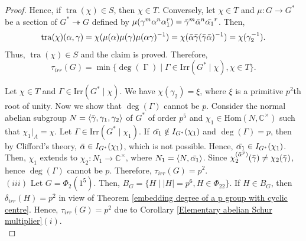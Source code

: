 \documentclass[a4paper,11pt]{amsart}
\numberwithin{equation}{section}
\numberwithin{equation}{subsection}
\newcommand{\C}{\mathbb{C}}
\newcommand{\Z}{\mathbb{Z}}
\newcommand{\Hom}{\mathrm{Hom}}
\newcommand{\Nayak}[1]{{\color{red} #1}}
\newcommand{\poonam}[1]{{\color{blue} #1}}
\begin{document}
\begin{proof}
Hence, if $\operatorname{tra}(\chi) \in S$, then $\chi\in T$. Conversely, let $\chi\in T$ and $\mu: G \to G^*$ be a section of $G^* \twoheadrightarrow G$ defined by $\mu(\gamma^{m} \alpha^{n} \alpha_1^{r}) = \Bar{\gamma}^{m} \Bar{\alpha}^{n} \Bar{\alpha_1}^{r}$. Then, 
$$\operatorname{tra}(\chi)(\alpha, \gamma) = \chi(\mu(\alpha)\mu(\gamma)\mu(\alpha\gamma)^{-1})=\chi(\Bar{\alpha}\Bar{\gamma}(\Bar{\gamma} \Bar{\alpha})^{-1})=\chi(\gamma_2^{-1}).$$ Thus, $\operatorname{tra}(\chi) \in S$ and the claim is proved.
Therefore, $$\tau_{irr}(G)=\operatorname{min}\{\operatorname{deg}(\operatorname{\Gamma}) \mid \Gamma \in \mathrm{Irr}(G^*\mid \chi),  \chi \in T\}.$$

Let $\chi \in T$ and $\Gamma \in \mathrm{Irr}(G^*\mid \chi)$. We have $\chi(\gamma_2)= \xi$,  where $\xi$ is a primitive $p^2$th root of unity. 
Now we 
show that $\operatorname{deg}(\Gamma)$ cannot be $p$.
Consider the normal abelian subgroup $N= \langle \Bar{\gamma}, \gamma_1, \gamma_2 \rangle$ of $G^*$ of order $p^5$ and $\chi_1 \in \Hom(N, \C^\times)$ such that $\chi_1|_A= \chi$. Let $\Gamma \in \mathrm{Irr}(G^*\mid \chi_1)$.
If $\Bar{\alpha_1} \notin {I_{{G}^*}(\chi_1)}$ and $\operatorname{deg}(\Gamma)=p$, then by  Clifford's theory, $\Bar{\alpha} \in {I_{{G}^*}(\chi_1)}$, which is not possible. Hence, $\Bar{\alpha_1} \in {I_{{G}^*}(\chi_1)}$. Then, $\chi_1$ extends to $\chi_2: N_1 \to \C^\times$, where $N_1= \langle N, \Bar{\alpha_1} \rangle$. Since $\chi_2^{(\Bar{\alpha}^p)}(\Bar{\gamma})\neq \chi_2(\Bar{\gamma})$, hence $\operatorname{deg}(\Gamma)$ cannot be $p$.  
Therefore, $\tau_{irr}(G)= p^2$. \\



$(iii)$  Let $G= \Phi_{2}(1^{5})$. Then, $B_{G}=\{H \mid |H|= p^6, H \in \Phi_{22}\}$. If $H \in B_{G}$, then $\delta_{irr}(H)= p^2$ in view of Theorem \ref{embedding degree of a p group with cyclic centre}. Hence, $\tau_{irr}(G)= p^2$ due to Corollary \ref{Elementary abelian Schur multiplier}$(i)$. \\


\end{proof}
\end{document}
